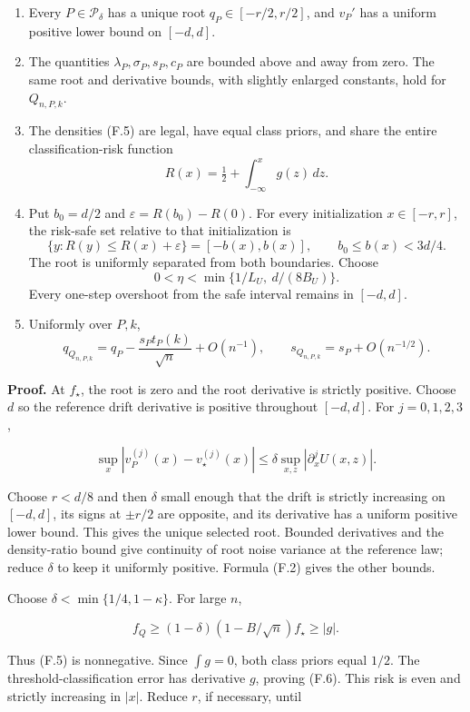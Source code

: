 \begin{enumerate}
\def\labelenumi{\arabic{enumi}.}
\tightlist
\item
  Every \(P\in\mathcal P_\delta\) has a unique root
  \(q_P\in[-r/2,r/2]\), and \(v_P'\) has a uniform positive lower bound
  on \([-d,d]\).
\item
  The quantities \(\lambda_P,\sigma_P,s_P,c_P\) are bounded above and
  away from zero. The same root and derivative bounds, with slightly
  enlarged constants, hold for \(Q_{n,P,k}\).
\item
  The densities (F.5) are legal, have equal class priors, and share the
  entire classification-risk function \[
  R(x)=\tfrac12+\int_{-\infty}^{x}g(z)\,dz.
  \tag{F.6}
  \]
\item
  Put \(b_0=d/2\) and \(\varepsilon=R(b_0)-R(0)\). For every
  initialization \(x\in[-r,r]\), the risk-safe set relative to that
  initialization is \[
  \{y:R(y)\le R(x)+\varepsilon\}
  =[-b(x),b(x)],\qquad b_0\le b(x)<3d/4.
  \tag{F.7}
  \] The root is uniformly separated from both boundaries. Choose \[
  0<\eta<\min\{1/L_U,\ d/(8B_U)\}.
  \tag{F.8}
  \] Every one-step overshoot from the safe interval remains in
  \([-d,d]\).
\item
  Uniformly over \(P,k\), \[
  q_{Q_{n,P,k}}
  =q_P-\frac{s_Pt_P(k)}{\sqrt n}+O(n^{-1}),\qquad
  s_{Q_{n,P,k}}=s_P+O(n^{-1/2}).
  \tag{F.9}
  \]
\end{enumerate}

\textbf{Proof.} At \(f_\star\), the root is zero and the root derivative
is strictly positive. Choose \(d\) so the reference drift derivative is
positive throughout \([-d,d]\). For \(j=0,1,2,3\),

\[
\sup_x|v_P^{(j)}(x)-v_\star^{(j)}(x)|
\le\delta\sup_{x,z}|\partial_x^jU(x,z)|.
\]

Choose \(r<d/8\) and then \(\delta\) small enough that the drift is
strictly increasing on \([-d,d]\), its signs at \(\pm r/2\) are
opposite, and its derivative has a uniform positive lower bound. This
gives the unique selected root. Bounded derivatives and the
density-ratio bound give continuity of root noise variance at the
reference law; reduce \(\delta\) to keep it uniformly positive. Formula
(F.2) gives the other bounds.

Choose \(\delta<\min\{1/4,1-\kappa\}\). For large \(n\),

\[
f_Q\ge(1-\delta)(1-B/\sqrt n)f_\star
     \ge |g|.
\]

Thus (F.5) is nonnegative. Since \(\int g=0\), both class priors equal
\(1/2\). The threshold-classification error has derivative \(g\),
proving (F.6). This risk is even and strictly increasing in \(|x|\).
Reduce \(r\), if necessary, until

